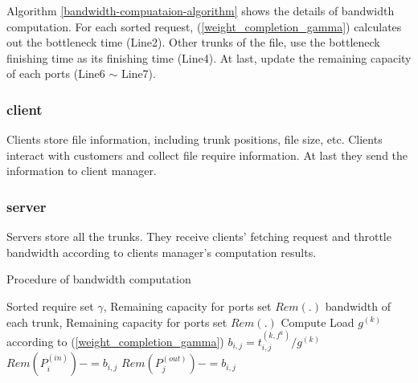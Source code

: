 \documentclass{IEEEtran}
\begin{document}
 Algorithm \ref{bandwidth-compuataion-algorithm} shows the details of bandwidth computation. 
For each sorted request, (\ref{weight_completion_gamma}) calculates out the bottleneck time (Line2). 
Other trunks of the file, use the bottleneck finishing time as its finishing time (Line4).
At last, update the remaining capacity of each ports (Line6 $\sim$ Line7).
\subsubsection{client}
Clients store file information, including trunk positions, file size, etc.
Clients interact with customers and collect file require information.
At last they send the information to client manager.
\subsubsection{server}
Servers store all the trunks. They receive clients' fetching request and 
throttle bandwidth according to clients manager's computation results.

\begin{algorithm} 
 \caption{Procedure of bandwidth computation}
 \begin{algorithmic}[1]\label{bandwidth-compuataion-algorithm}
 \renewcommand{\algorithmicrequire}{\textbf{Input: }}
 \renewcommand{\algorithmicensure}{\textbf{Output:}}
\REQUIRE Sorted require set $\gamma$, Remaining capacity for ports set $Rem(.)$
\ENSURE  bandwidth of each trunk, Remaining capacity for ports set $Rem(.)$
 \STATE Compute Load $g^{(k)}$ according to (\ref{weight_completion_gamma})
 \STATE $b_{i,j}=t_{i,j}^{(k,f^k)}/g^{(k)}$
\STATE $Rem(P_i^{(in)})-=b_{i,j}$
\STATE $Rem(P_j^{(out)})-=b_{i,j}$
 \ENDFOR
\ENDFOR
\end{algorithmic} 
\end{algorithm}



 
 
\end{document}
